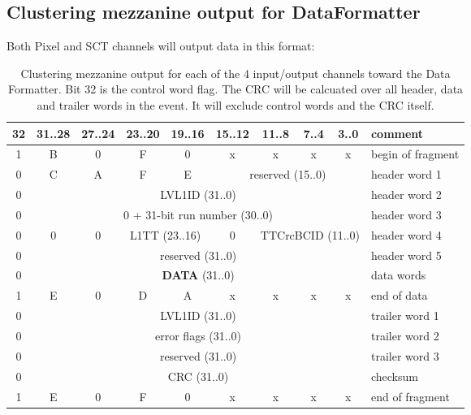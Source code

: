 \documentclass[10pt]{article}
\numberwithin{figure}{section}
\numberwithin{equation}{section}
\numberwithin{table}{section}
\newcommand{\0}{\phantom{0}}
\begin{document}
\clearpage
\subsection{Clustering mezzanine output for DataFormatter}
\label{FTK_IM_Output}
Both Pixel and SCT channels will output data in this format:

\begin{table}[h]
\begin{tabular}{c|c|c|c|c|c|c|c|c|l}
32 & 31..28 & 27..24 & 23..20 & 19..16 & 15..12 & 11..8 & 7..4 & 3..0 & comment\\ \hline
  1 & B & 0 & F & 0 & x & x & x & x & begin of fragment\\\hline
  0 & C & A & F & E & \multicolumn{4}{c|}{reserved (15..0)} & header word 1\\\hline
  0 & \multicolumn{8}{c|}{LVL1ID (31..0)} & header word 2 \\ \hline
  0 & \multicolumn{8}{c|}{0 + 31-bit run number (30..0)} & header word 3 \\ \hline
  0 & 0 & 0 & \multicolumn{2}{c|}{L1TT (23..16)} & 0 &  \multicolumn{3}{c|}{TTCrcBCID (11..0)}  & header word 4\\ \hline
  0 & \multicolumn{8}{c|}{reserved (31..0)}  & header word 5 \\ \hline
  0 & \multicolumn{8}{c|}{\textbf{DATA} (31..0)}  & data words \\ \hline
  1 & E & 0 & D & A & x & x & x & x & end of data\\\hline
  0 & \multicolumn{8}{c|}{LVL1ID (31..0)} & trailer word 1\\ \hline
  0 & \multicolumn{8}{c|}{error flags (31..0)} & trailer word 2\\\hline 
  0 & \multicolumn{8}{c|}{reserved (31..0)} & trailer word 3\\ \hline
  0 & \multicolumn{8}{c|}{CRC (31..0)} & checksum \\ \hline
  1 & E & 0 & F & 0 & x & x & x & x & end of fragment \\\hline
\end{tabular}
\caption{\label{tab:clustering_output}Clustering mezzanine output for each of the 4 input/output channels toward the Data Formatter. Bit 32 is the control word flag. The CRC will be calcuated over all header, data and trailer words in the event. It will exclude control words and the CRC itself.}
\end{table}
\end{document}
